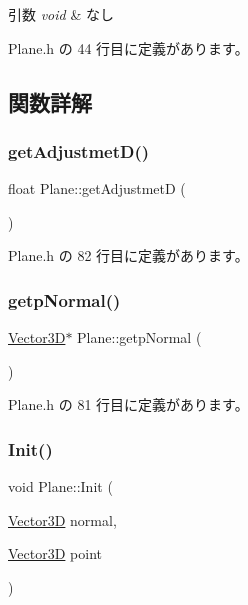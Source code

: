 \begin{DoxyParams}{引数}
{\em void} & なし \\
\hline
\end{DoxyParams}


 Plane.\+h の 44 行目に定義があります。



\subsection{関数詳解}
\mbox{\label{class_plane_a66c47e8798df166c458ca215ed115684}} 
\subsubsection{\texorpdfstring{get\+Adjustmet\+D()}{getAdjustmetD()}}
{\footnotesize\ttfamily float Plane\+::get\+AdjustmetD (\begin{DoxyParamCaption}{ }\end{DoxyParamCaption})\hspace{0.3cm}{\ttfamily [inline]}}



 Plane.\+h の 82 行目に定義があります。

\mbox{\label{class_plane_a426c05b5e1d2f12562ac562333863ebb}} 
\subsubsection{\texorpdfstring{getp\+Normal()}{getpNormal()}}
{\footnotesize\ttfamily \mbox{\hyperlink{class_vector3_d}{Vector3D}}$\ast$ Plane\+::getp\+Normal (\begin{DoxyParamCaption}{ }\end{DoxyParamCaption})\hspace{0.3cm}{\ttfamily [inline]}}



 Plane.\+h の 81 行目に定義があります。

\mbox{\label{class_plane_a2182719af8f880a3871be4cfc33a969b}} 
\subsubsection{\texorpdfstring{Init()}{Init()}\hspace{0.1cm}{\footnotesize\ttfamily [1/2]}}
{\footnotesize\ttfamily void Plane\+::\+Init (\begin{DoxyParamCaption}\item[{\mbox{\hyperlink{class_vector3_d}{Vector3D}}}]{normal,  }\item[{\mbox{\hyperlink{class_vector3_d}{Vector3D}}}]{point }\end{DoxyParamCaption})\hspace{0.3cm}{\ttfamily [inline]}}



